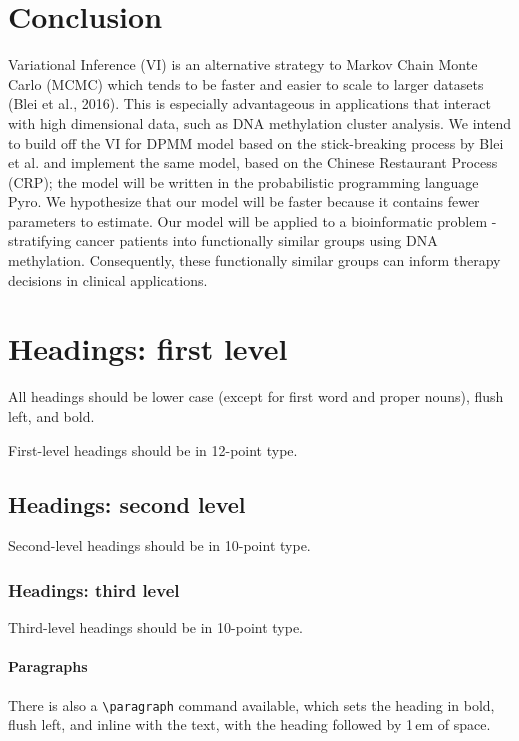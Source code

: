 \documentclass{article}
\begin{document}
\section{Conclusion}
Variational Inference (VI) is an alternative strategy to Markov Chain Monte Carlo (MCMC) which tends to be faster and easier to scale to larger datasets (Blei et al., 2016). This is especially advantageous in applications that interact with high dimensional data, such as DNA methylation cluster analysis. We intend to build off the VI for DPMM model based on the stick-breaking process by Blei et al. and implement the same model, based on the Chinese Restaurant Process (CRP); the model will be written in the probabilistic programming language Pyro. We hypothesize that our model will be faster because it contains fewer parameters to estimate. Our model will be applied to a bioinformatic problem - stratifying cancer patients into functionally similar groups using DNA methylation. Consequently, these functionally similar groups can inform therapy decisions in clinical applications. 

\newpage
\section{Headings: first level}
\label{headings}

All headings should be lower case (except for first word and proper nouns),
flush left, and bold.

First-level headings should be in 12-point type.

\subsection{Headings: second level}

Second-level headings should be in 10-point type.

\subsubsection{Headings: third level}

Third-level headings should be in 10-point type.

\paragraph{Paragraphs}

There is also a \verb+\paragraph+ command available, which sets the heading in
bold, flush left, and inline with the text, with the heading followed by 1\,em
of space.
\end{document}
